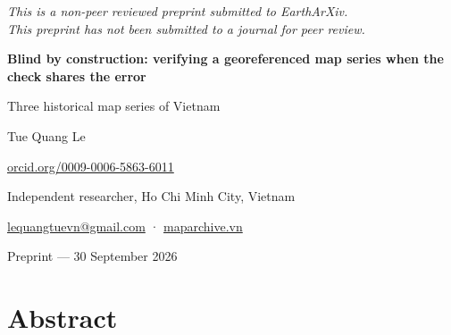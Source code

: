 \documentclass[11pt,a4paper]{article}
\begin{document}
\begin{center}
{\small\itshape This is a non-peer reviewed preprint submitted to EarthArXiv.\\
This preprint has not been submitted to a journal for peer review.\par}
\end{center}
\vspace{1.5em}
\begin{center}
{\LARGE\bfseries Blind by construction: verifying a georeferenced map series when the check shares the error\par}
\vspace{0.5em}
{\large Three historical map series of Vietnam\par}
\vspace{1.2em}
{\large Tue Quang Le\par}
\vspace{0.3em}
{\small \href{https://orcid.org/0009-0006-5863-6011}{orcid.org/0009-0006-5863-6011}\par}
{\small Independent researcher, Ho Chi Minh City, Vietnam\par}
{\small \href{mailto:lequangtuevn@gmail.com}{lequangtuevn@gmail.com} · \href{https://maparchive.vn}{maparchive.vn}\par}
\vspace{1em}
{\small Preprint — 30 September 2026\par}
\end{center}

\section*{Abstract}
\end{document}
